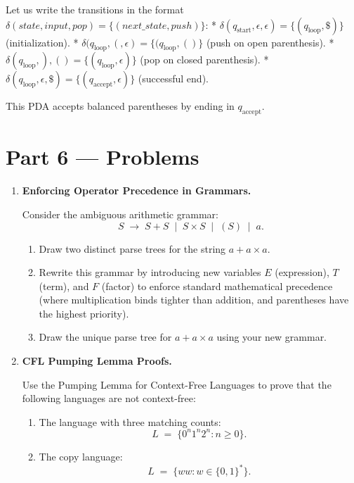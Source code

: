 \documentclass[12pt, a4paper]{book}
\begin{document}
\begin{problembox}
\begin{enumerate}[label=\textbf{E\arabic*.}]
        Let us write the transitions in the format $\delta(state, input, pop) = \{(next\_state, push)\}$:
        * $\delta(q_{\text{start}}, \epsilon, \epsilon) = \{(q_{\text{loop}}, \$)\}$ (initialization).
        * $\delta(q_{\text{loop}}, (, \epsilon) = \{(q_{\text{loop}}, ()\}$ (push on open parenthesis).
        * $\delta(q_{\text{loop}}, ), () = \{(q_{\text{loop}}, \epsilon)\}$ (pop on closed parenthesis).
        * $\delta(q_{\text{loop}}, \epsilon, \$) = \{(q_{\text{accept}}, \epsilon)\}$ (successful end).
        
        This PDA accepts balanced parentheses by ending in $q_{\text{accept}}$.
\end{enumerate}
\end{problembox}

\newpage

\section{Part 6 --- Problems}

\begin{problembox}
\begin{enumerate}[label=\textbf{P\arabic*.}]
  \item \textbf{Enforcing Operator Precedence in Grammars.}
  
        Consider the ambiguous arithmetic grammar:
        \[
          S \;\to\; S + S \;\mid\; S \times S \;\mid\; (S) \;\mid\; a.
        \]
        \begin{enumerate}[label=(\alph*)]
          \item Draw two distinct parse trees for the string $a + a \times a$.
          \item Rewrite this grammar by introducing new variables $E$ (expression), $T$ (term), and $F$ (factor) to enforce standard mathematical precedence (where multiplication binds tighter than addition, and parentheses have the highest priority).
          \item Draw the unique parse tree for $a + a \times a$ using your new grammar.
        \end{enumerate}

  \item \textbf{CFL Pumping Lemma Proofs.}
  
        Use the Pumping Lemma for Context-Free Languages to prove that the following languages are not context-free:
        \begin{enumerate}[label=(\alph*)]
          \item The language with three matching counts:
                \[
                  L \;= \; \{0^n 1^n 2^n : n \ge 0\}.
                \]
          \item The copy language:
                \[
                  L \;=\; \{w w : w \in \{0, 1\}^*\}.
                \]
        \end{enumerate}
\end{enumerate}
\end{problembox}
\end{document}
